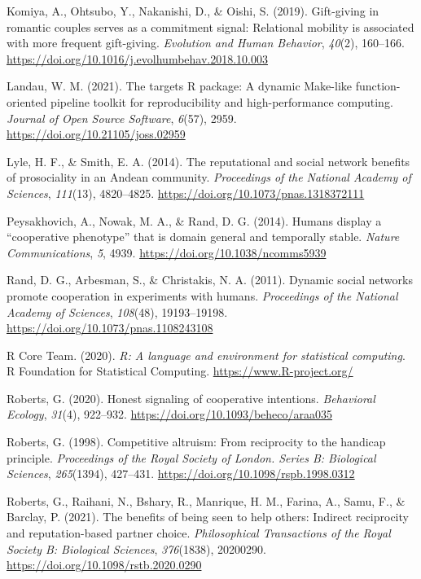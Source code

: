\documentclass[english,man,floatsintext]{apa6}
\begin{document}
\leavevmode\hypertarget{ref-Komiya2019}{}%
Komiya, A., Ohtsubo, Y., Nakanishi, D., \& Oishi, S. (2019). Gift-giving in romantic couples serves as a commitment signal: Relational mobility is associated with more frequent gift-giving. \emph{Evolution and Human Behavior}, \emph{40}(2), 160--166. \url{https://doi.org/10.1016/j.evolhumbehav.2018.10.003}

\leavevmode\hypertarget{ref-Landau2021}{}%
Landau, W. M. (2021). The targets R package: A dynamic Make-like function-oriented pipeline toolkit for reproducibility and high-performance computing. \emph{Journal of Open Source Software}, \emph{6}(57), 2959. \url{https://doi.org/10.21105/joss.02959}

\leavevmode\hypertarget{ref-Lyle2014}{}%
Lyle, H. F., \& Smith, E. A. (2014). The reputational and social network benefits of prosociality in an Andean community. \emph{Proceedings of the National Academy of Sciences}, \emph{111}(13), 4820--4825. \url{https://doi.org/10.1073/pnas.1318372111}

\leavevmode\hypertarget{ref-Peysakhovich2014}{}%
Peysakhovich, A., Nowak, M. A., \& Rand, D. G. (2014). Humans display a ``cooperative phenotype'' that is domain general and temporally stable. \emph{Nature Communications}, \emph{5}, 4939. \url{https://doi.org/10.1038/ncomms5939}

\leavevmode\hypertarget{ref-Rand2011}{}%
Rand, D. G., Arbesman, S., \& Christakis, N. A. (2011). Dynamic social networks promote cooperation in experiments with humans. \emph{Proceedings of the National Academy of Sciences}, \emph{108}(48), 19193--19198. \url{https://doi.org/10.1073/pnas.1108243108}

\leavevmode\hypertarget{ref-R}{}%
R Core Team. (2020). \emph{R: A language and environment for statistical computing}. R Foundation for Statistical Computing. \url{https://www.R-project.org/}

\leavevmode\hypertarget{ref-Roberts2020}{}%
Roberts, G. (2020). Honest signaling of cooperative intentions. \emph{Behavioral Ecology}, \emph{31}(4), 922--932. \url{https://doi.org/10.1093/beheco/araa035}

\leavevmode\hypertarget{ref-Roberts1998}{}%
Roberts, G. (1998). Competitive altruism: From reciprocity to the handicap principle. \emph{Proceedings of the Royal Society of London. Series B: Biological Sciences}, \emph{265}(1394), 427--431. \url{https://doi.org/10.1098/rspb.1998.0312}

\leavevmode\hypertarget{ref-Roberts2021}{}%
Roberts, G., Raihani, N., Bshary, R., Manrique, H. M., Farina, A., Samu, F., \& Barclay, P. (2021). The benefits of being seen to help others: Indirect reciprocity and reputation-based partner choice. \emph{Philosophical Transactions of the Royal Society B: Biological Sciences}, \emph{376}(1838), 20200290. \url{https://doi.org/10.1098/rstb.2020.0290}
\end{document}
